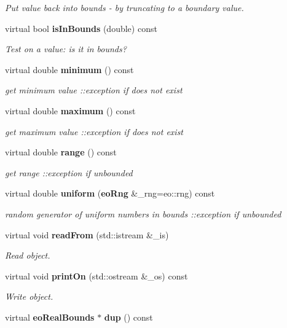 \begin{CompactItemize}
\begin{CompactList}\small\item\em Put value back into bounds - by truncating to a boundary value. \item\end{CompactList}\item 
virtual bool {\bf is\-In\-Bounds} (double) const \label{classeo_real_no_bounds_a7}

\begin{CompactList}\small\item\em Test on a value: is it in bounds? \item\end{CompactList}\item 
virtual double {\bf minimum} () const \label{classeo_real_no_bounds_a8}

\begin{CompactList}\small\item\em get minimum value ::exception if does not exist \item\end{CompactList}\item 
virtual double {\bf maximum} () const \label{classeo_real_no_bounds_a9}

\begin{CompactList}\small\item\em get maximum value ::exception if does not exist \item\end{CompactList}\item 
virtual double {\bf range} () const \label{classeo_real_no_bounds_a10}

\begin{CompactList}\small\item\em get range ::exception if unbounded \item\end{CompactList}\item 
virtual double {\bf uniform} ({\bf eo\-Rng} \&\_\-rng=eo::rng) const \label{classeo_real_no_bounds_a11}

\begin{CompactList}\small\item\em random generator of uniform numbers in bounds ::exception if unbounded \item\end{CompactList}\item 
virtual void {\bf read\-From} (std::istream \&\_\-is)
\begin{CompactList}\small\item\em Read object. \item\end{CompactList}\item 
virtual void {\bf print\-On} (std::ostream \&\_\-os) const 
\begin{CompactList}\small\item\em Write object. \item\end{CompactList}\item 
virtual {\bf eo\-Real\-Bounds} $\ast$ {\bf dup} () const \label{classeo_real_no_bounds_a14}


\end{CompactItemize}
